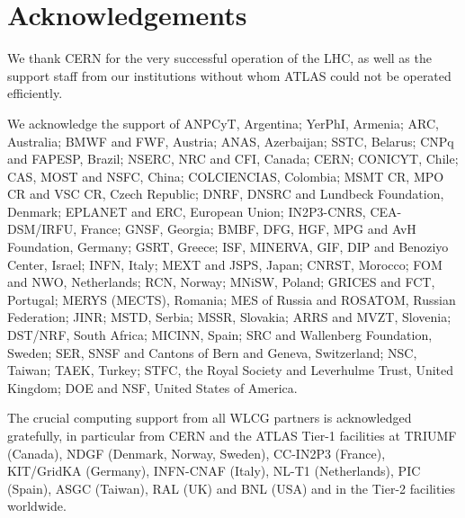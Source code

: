 \documentclass[11pt,a4paper,dvips]{article}
\begin{document}

\section{Acknowledgements}

We thank CERN for the very successful operation of the LHC, as well as the
support staff from our institutions without whom ATLAS could not be
operated efficiently.

We acknowledge the support of ANPCyT, Argentina; YerPhI, Armenia; ARC,
Australia; BMWF and FWF, Austria; ANAS, Azerbaijan; SSTC, Belarus; CNPq and FAPESP,
Brazil; NSERC, NRC and CFI, Canada; CERN; CONICYT, Chile; CAS, MOST and NSFC,
China; COLCIENCIAS, Colombia; MSMT CR, MPO CR and VSC CR, Czech Republic;
DNRF, DNSRC and Lundbeck Foundation, Denmark; EPLANET and ERC, European Union;
IN2P3-CNRS, CEA-DSM/IRFU, France; GNSF, Georgia; BMBF, DFG, HGF, MPG and AvH
Foundation, Germany; GSRT, Greece; ISF, MINERVA, GIF, DIP and Benoziyo Center,
Israel; INFN, Italy; MEXT and JSPS, Japan; CNRST, Morocco; FOM and NWO,
Netherlands; RCN, Norway; MNiSW, Poland; GRICES and FCT, Portugal; MERYS
(MECTS), Romania; MES of Russia and ROSATOM, Russian Federation; JINR; MSTD,
Serbia; MSSR, Slovakia; ARRS and MVZT, Slovenia; DST/NRF, South Africa;
MICINN, Spain; SRC and Wallenberg Foundation, Sweden; SER, SNSF and Cantons of
Bern and Geneva, Switzerland; NSC, Taiwan; TAEK, Turkey; STFC, the Royal
Society and Leverhulme Trust, United Kingdom; DOE and NSF, United States of
America.

The crucial computing support from all WLCG partners is acknowledged
gratefully, in particular from CERN and the ATLAS Tier-1 facilities at
TRIUMF (Canada), NDGF (Denmark, Norway, Sweden), CC-IN2P3 (France),
KIT/GridKA (Germany), INFN-CNAF (Italy), NL-T1 (Netherlands), PIC (Spain),
ASGC (Taiwan), RAL (UK) and BNL (USA) and in the Tier-2 facilities
worldwide.
\end{document}

